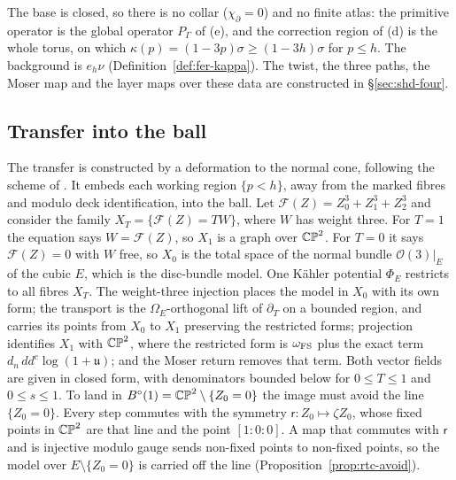 The base is closed, so there is no collar ($\chi_\partial=0$) and no finite atlas: the primitive operator is the global
operator $P_\Gamma$ of (e), and the correction region of (d) is the whole torus, on
which $\kappa(p)=(1-3p)\sigma\ge(1-3h)\sigma$ for $p\le h$. The background is $e_h\nu$ (Definition~\ref{def:fer-kappa}). The
twist, the three paths, the Moser map and the layer maps over these data are constructed in \S\ref{sec:shd-four}.

\subsection{Transfer into the ball}

The transfer is constructed by a deformation to the normal cone, following the scheme of \cite{OpenAI2026}.
It embeds each working region $\{p<h\}$, away from the marked fibres and modulo deck identification, into the
ball. Let $\mathcal F(Z)=Z_0^3+Z_1^3+Z_2^3$ and consider the family
$X_T=\{\mathcal F(Z)=TW\}$, where $W$ has weight three. For $T=1$ the equation says $W=\mathcal F(Z)$, so $X_1$ is a graph
over $\mathbb{CP}^2$. For $T=0$ it says $\mathcal F(Z)=0$ with $W$ free, so $X_0$ is the total space of the normal bundle
$\mathcal O(3)|_E$ of the cubic $E$, which is the disc-bundle model. One Kähler potential $\Phi_E$ restricts to
all fibres $X_T$. The weight-three injection places the model in $X_0$ with its own form; the transport is the
$\Omega_E$-orthogonal lift of $\partial_T$ on a bounded region, and carries its points from
$X_0$ to $X_1$ preserving the restricted forms; projection identifies $X_1$
with $\mathbb{CP}^2$, where the restricted form is $\omega_{\rm FS}$ plus the exact term $d_n\,dd^c\log(1+\mathfrak u)$; and
the Moser return removes that term. Both vector fields are given in closed form, with denominators bounded below
for $0\le T\le1$ and $0\le s\le1$. To land in $B^{\circ}(1)=\mathbb{CP}^2\setminus\{Z_0=0\}$ the image must avoid the line
$\{Z_0=0\}$. Every step commutes with the symmetry $\mathsf r\colon Z_0\mapsto\zeta Z_0$, whose fixed points in $\mathbb{CP}^2$ are that line
and the point $[1:0:0]$. A map that commutes with $\mathsf r$ and is injective modulo gauge sends non-fixed points to
non-fixed points, so the model over $E\setminus\{Z_0=0\}$ is carried off the line
(Proposition~\ref{prop:rtc-avoid}).

